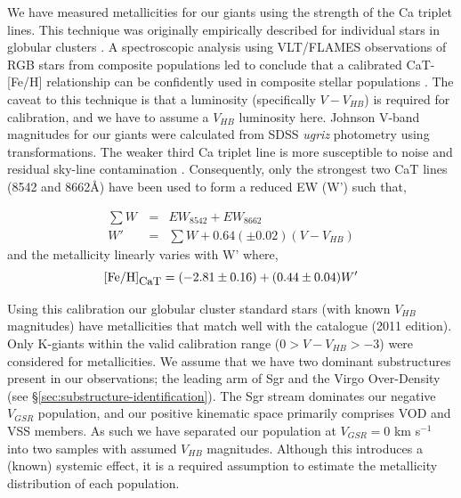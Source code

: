 \documentclass[preprint2]{aastex}
\begin{document}
We have measured metallicities for our giants using the strength of the Ca triplet lines. This technique was originally empirically described for individual stars in globular  clusters \citep{Armandroff;Da-Costa_1991}. A spectroscopic analysis using VLT/FLAMES observations of RGB stars from composite populations led \citet{Battaglia;et-al_2008} to conclude that a calibrated CaT-[Fe/H] relationship can be confidently used in composite stellar populations \citep[see also][]{Rutledge;Hesser;Stetson_1997, Starkenburg;et-al_2010}. The caveat to this technique is that a luminosity (specifically $V - V_{HB}$) is required for calibration, and we have to assume a $V_{HB}$ luminosity here. Johnson V-band magnitudes for our giants were calculated from SDSS \textit{ugriz} photometry using \citet{Jester;et-al_2005} transformations. The weaker third Ca triplet line is more susceptible to noise and residual sky-line contamination \citep{Tolstoy;et-al_2001,Battaglia;et-al_2008}. Consequently, only the strongest two CaT lines (8542 and 8662\AA) have been used to form a reduced EW (W') such that,

\begin{eqnarray}
	\textstyle\sum{W}\, &=& EW_{8542} + EW_{8662} \\
	W' &=&\textstyle\sum{W} + 0.64\left(\pm 0.02\right)\left(V-V_{HB}\right)
\end{eqnarray}
\noindent and the metallicity linearly varies with W' where,
\begin{equation}
	\mbox{[Fe/H]}_{\mbox{\small{CaT}}} = (-2.81\pm0.16) + (0.44\pm0.04) W'
	\label{eq:feh-cat}
\end{equation}

Using this calibration our globular cluster standard stars (with known $V_{HB}$ magnitudes) have metallicities that match well with the \citet{Harris_1996} catalogue (2011 edition). Only K-giants within the valid calibration range ($0 > V-V_{HB} > -3$) were considered for metallicities. We assume that we have two dominant substructures present in our observations; the leading arm of Sgr and the Virgo Over-Density (see \S\ref{sec:substructure-identification}). The Sgr stream dominates our negative $V_{GSR}$ population, and our positive kinematic space primarily comprises VOD and VSS members. As such we have separated our population at $V_{GSR} = 0$ km s$^{-1}$ into two samples with assumed $V_{HB}$ magnitudes. Although this introduces a (known) systemic effect, it is a required assumption to estimate the metallicity distribution of each population.
\end{document}
